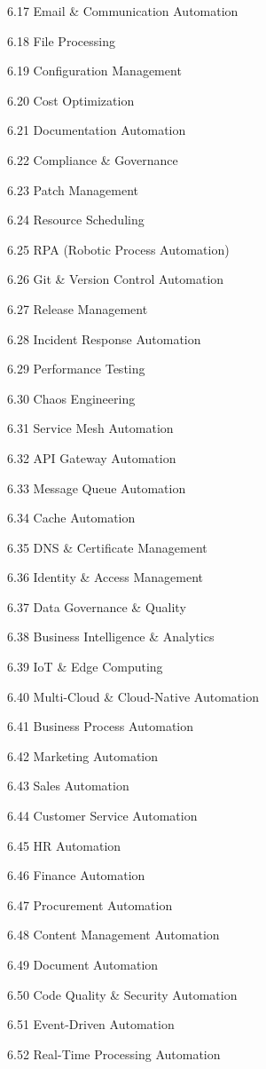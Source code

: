 \documentclass[11pt,a4paper]{article}
\begin{document}
   6.17 Email \& Communication Automation

   6.18 File Processing

   6.19 Configuration Management

   6.20 Cost Optimization

   6.21 Documentation Automation

   6.22 Compliance \& Governance

   6.23 Patch Management

   6.24 Resource Scheduling

   6.25 RPA (Robotic Process Automation)

   6.26 Git \& Version Control Automation

   6.27 Release Management

   6.28 Incident Response Automation

   6.29 Performance Testing

   6.30 Chaos Engineering

   6.31 Service Mesh Automation

   6.32 API Gateway Automation

   6.33 Message Queue Automation

   6.34 Cache Automation

   6.35 DNS \& Certificate Management

   6.36 Identity \& Access Management

   6.37 Data Governance \& Quality

   6.38 Business Intelligence \& Analytics

   6.39 IoT \& Edge Computing

   6.40 Multi-Cloud \& Cloud-Native Automation

   6.41 Business Process Automation

   6.42 Marketing Automation

   6.43 Sales Automation

   6.44 Customer Service Automation

   6.45 HR Automation

   6.46 Finance Automation

   6.47 Procurement Automation

   6.48 Content Management Automation

   6.49 Document Automation

   6.50 Code Quality \& Security Automation

   6.51 Event-Driven Automation

   6.52 Real-Time Processing Automation
\end{document}

